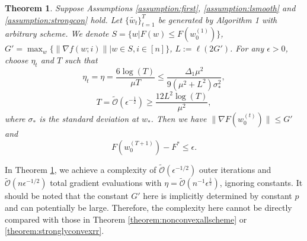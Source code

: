 \documentclass{article} %
\theoremstyle{plain}
\newtheorem{theorem}{Theorem}[section]
\theoremstyle{definition}
\theoremstyle{remark}
\begin{document}
\begin{theorem}
\label{theorem:stronglyconvexany}
 Suppose Assumptions \ref{assumption:first}, \ref{assumption:lsmooth} and \ref{assumption:strongcon} hold. Let $\{\tilde{w_t}\}_{t=1}^T$ be generated by Algorithm 1 with arbitrary scheme. We denote $S=\{w|F(w)\leq F(w^{(1)}_0)\}$, $G'=\max_w\{\|\nabla f(w;i)\||w\in S, i\in[n]\}$, $L:=\ell(2G')$. For any $\epsilon>0$, choose $\eta_t$ and $T$ such that
 $$\eta_t=\eta=\frac{6\log(T)}{\mu T}\leq \frac{\Delta_1\mu^2}{9(\mu^2+L^2)\sigma^2_*},$$ 
 $$T=\widetilde{\mathcal{O}}(\epsilon^{-\frac12})\geq \frac{12L^2\log(T)}{\mu^2},$$
    where $\sigma_*$ is the standard deviation at $w_*$. Then we have $\|\nabla F(w^{(t)}_0)\|\leq G'$ and 
    $$F(w^{(T+1)}_0)-F^*\leq \epsilon.$$
\end{theorem}


In Theorem \ref{theorem:stronglyconvexany}, we achieve a complexity of $\widetilde{\mathcal{O}}\left(\epsilon^{-1/2}\right)$ outer iterations and $\widetilde{\mathcal{O}}\left(n\epsilon^{-1/2}\right)$ total gradient evaluations with $\eta=\widetilde{\mathcal{O}}\left(n^{-1}\epsilon^{\frac{1}{2}}\right)$, ignoring constants. It should be noted that the constant $G'$ here is implicitly determined by constant $p$ and can potentially be large. Therefore, the complexity here cannot be directly compared with those in Theorem \ref{theorem:nonconvexallscheme} or \ref{theorem:stronglyconvexrr}.
\end{document}
